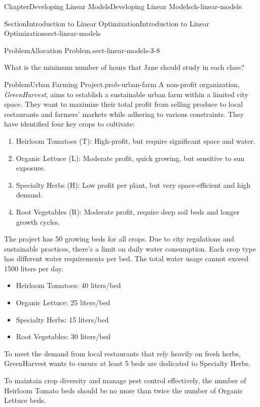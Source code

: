 \documentclass[oneside,10pt,]{book}
\numberwithin{equation}{section}
\begin{document}
\begin{chapterptx}{Chapter}{Developing Linear Models}{}{Developing Linear Models}{}{}{ch-linear-models}
\begin{sectionptx}{Section}{Introduction to Linear Optimization}{}{Introduction to Linear Optimization}{}{}{sect-linear-models}
\begin{introduction}{}
\begin{problem}{Problem}{Allocation Problem.}{sect-linear-models-3-8}
\begin{enumerate}
\end{enumerate}
%
\par
What is the minimum number of hours that Jane should study in each class?%
\end{problem}
\begin{problem}{Problem}{Urban Farming Project.}{prob-urban-farm}%
A non-profit organization, \emph{GreenHarvest}, aims to establish a sustainable urban farm within a limited city space.\footnotemark{} They want to maximize their total profit from selling produce to local restaurants and farmers' markets while adhering to various constraints. They have identified four key crops to cultivate:%
\par
%
\begin{enumerate}
\item{}Heirloom Tomatoes (T): High-profit, but require significant space and water.%
\item{}Organic Lettuce (L): Moderate profit, quick growing, but sensitive to sun exposure.%
\item{}Specialty Herbs (H): Low profit per plant, but very space-efficient and high demand.%
\item{}Root Vegetables (R): Moderate profit, require deep soil beds and longer growth cycles.%
\end{enumerate}
%
\par
The project has 50 growing beds for all crops. Due to city regulations and sustainable practices, there's a limit on daily water consumption. Each crop type has different water requirements per bed. The total water usage cannot exceed 1500 liters per day.%
\par
%
\begin{itemize}[label=\textbullet]
\item{}Heirloom Tomatoes: 40 liters\slash{}bed%
\item{}Organic Lettuce: 25 liters\slash{}bed%
\item{}Specialty Herbs: 15 liters\slash{}bed%
\item{}Root Vegetables: 30 liters\slash{}bed%
\end{itemize}
%
\par
To meet the demand from local restaurants that rely heavily on fresh herbs, GreenHarvest wants to ensure at least 5 beds are dedicated to Specialty Herbs.%
\par
To maintain crop diversity and manage pest control effectively, the number of Heirloom Tomato beds should be no more than twice the number of Organic Lettuce beds.%
\par

\end{problem}
\end{introduction}
\end{sectionptx}
\end{chapterptx}
\end{document}
